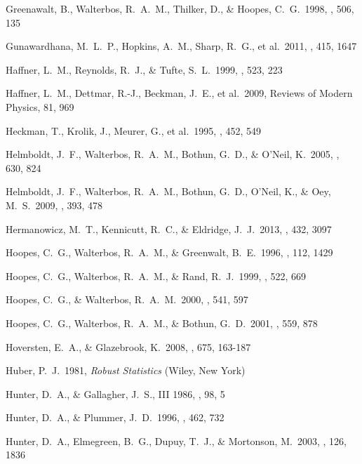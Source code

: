  Greenawalt, B., Walterbos, R.~A.~M., Thilker, D., \& Hoopes, C.~G.\ 1998, \apj, 506, 135 


 Gunawardhana, M.~L.~P., Hopkins, A.~M., Sharp, R.~G., et al.\ 2011, \mnras, 415, 1647 


 Haffner, L.~M., Reynolds, R.~J., \& Tufte, S.~L.\ 1999, \apj, 523, 223 

 Haffner, L.~M., Dettmar, R.-J., Beckman, J.~E., et al.\ 2009, Reviews of Modern Physics, 81, 969 

 Heckman, T., Krolik, J., Meurer, G., et al.\ 1995, \apj, 452, 549 

 Helmboldt, J.~F., Walterbos, R.~A.~M., Bothun, G.~D., \& O'Neil, K.\ 2005, \apj, 630, 824 

 Helmboldt, J.~F., Walterbos, R.~A.~M., Bothun, G.~D., O'Neil, K., \& Oey, M.~S.\ 2009, \mnras, 393, 478 

 Hermanowicz, M.~T., Kennicutt, R.~C., \& Eldridge, J.~J.\ 2013, \mnras, 432, 3097 

 Hoopes, C.~G., Walterbos, R.~A.~M., \& Greenwalt, B.~E.\ 1996, \aj, 112, 1429 

 Hoopes, C.~G., Walterbos, R.~A.~M., \& Rand, R.~J.\ 1999, \apj, 522, 669 

 Hoopes, C.~G., \& Walterbos, R.~A.~M.\ 2000, \apj, 541, 597 

 Hoopes, C.~G., Walterbos, R.~A.~M., \& Bothun, G.~D.\ 2001, \apj, 559, 878 


 Hoversten, E.~A., \& Glazebrook, K.\ 2008, \apj, 675, 163-187 

 Huber, P.~J.\ 1981, \emph{Robust
 Statistics} (Wiley, New York)

 Hunter, D.~A., \& Gallagher, J.~S., III 1986, \pasp, 98, 5 


 Hunter, D.~A., \& Plummer, J.~D.\ 1996, \apj, 462, 732 

 Hunter, D.~A., Elmegreen, B.~G., Dupuy, T.~J., \& Mortonson, M.\ 2003, \aj, 126, 1836 

